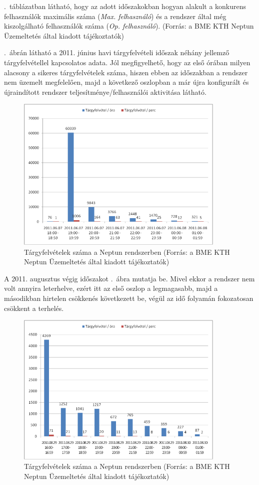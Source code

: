 .~táblázatban látható, hogy az adott időszakokban hogyan alakult a konkurens felhasználók maximális száma (\textit{Max. felhasználó}) és a rendszer által még kiszolgálható felhasználók száma (\textit{Op. felhasználó}). (Forrás: a BME KTH Neptun Üzemeltetés által kiadott tájékoztatók)



.~ábrán látható a 2011. június havi tárgyfelvételi időszak néhány jellemző tárgyfelvétellel kapcsolatos adata. Jól megfigyelhető, hogy az első órában milyen alacsony a sikeres tárgyfelvételek száma, hiszen ebben az időszakban a rendszer nem üzemelt megfelelően, majd a következő oszlopban a már újra konfigurált és újraindított rendszer teljesítménye/felhasználói aktivitása látható.

\begin{figure}[!ht]
\centering
\includegraphics[width=100mm, keepaspectratio]{figures/neptun_003.png}
\caption{Tárgyfelvételek száma a Neptun rendszerben (Forrás: a BME KTH Neptun Üzemeltetés által kiadott tájékoztatók)}
\label{fig:neptun_003}
\end{figure}

A 2011. augusztus végig időszakot .~ábra mutatja be. Mivel ekkor a rendszer nem volt annyira leterhelve, ezért itt az első oszlop a legmagasabb, majd a másodikban hirtelen csökkenés következett be, végül az idő folyamán fokozatosan csökkent a terhelés.

\begin{figure}[!ht]
\centering
\includegraphics[width=100mm, keepaspectratio]{figures/neptun_004.png}
\caption{Tárgyfelvételek száma a Neptun rendszerben (Forrás: a BME KTH Neptun Üzemeltetés által kiadott tájékoztatók)}
\label{fig:neptun_004}
\end{figure}

